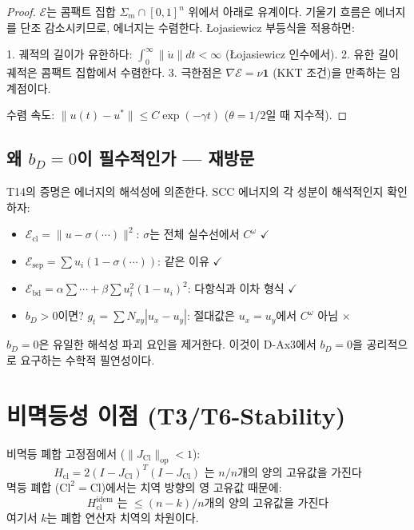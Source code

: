 \begin{proof}
$\mathcal{E}$는 콤팩트 집합 $\Sigma_m \cap [0,1]^n$ 위에서 아래로 유계이다. 기울기 흐름은 에너지를 단조 감소시키므로, 에너지는 수렴한다. \L{}ojasiewicz 부등식을 적용하면:

1. 궤적의 길이가 유한하다: $\int_0^\infty \|\dot{u}\| dt < \infty$ (\L{}ojasiewicz 인수에서).
2. 유한 길이 궤적은 콤팩트 집합에서 수렴한다.
3. 극한점은 $\nabla \mathcal{E} = \nu \mathbf{1}$ (KKT 조건)을 만족하는 임계점이다.

수렴 속도: $\|u(t) - u^*\| \leq C \exp(-\gamma t)$ ($\theta = 1/2$일 때 지수적).
\end{proof}

\subsection{왜 $b_D = 0$이 필수적인가 --- 재방문}

T14의 증명은 에너지의 해석성에 의존한다. SCC 에너지의 각 성분이 해석적인지 확인하자:
\begin{itemize}
    \item $\mathcal{E}_{\mathrm{cl}} = \|u - \sigma(\cdots)\|^2$: $\sigma$는 전체 실수선에서 $C^\omega$ $\checkmark$
    \item $\mathcal{E}_{\mathrm{sep}} = \sum u_i(1 - \sigma(\cdots))$: 같은 이유 $\checkmark$
    \item $\mathcal{E}_{\mathrm{bd}} = \alpha\sum\cdots + \beta\sum u_i^2(1-u_i)^2$: 다항식과 이차 형식 $\checkmark$
    \item $b_D > 0$이면? $g_t = \sum N_{xy}|u_x - u_y|$: 절대값은 $u_x = u_y$에서 $C^\omega$ 아님 $\times$
\end{itemize}

$b_D = 0$은 유일한 해석성 파괴 요인을 제거한다. 이것이 D-Ax3에서 $b_D = 0$을 공리적으로 요구하는 수학적 필연성이다.


\section{비멱등성 이점 (T3/T6-Stability)}
\label{sec:non-idempotence}

\begin{theorem}
\label{thm:stability}
비멱등 폐합 고정점에서 ($\|J_{\mathrm{Cl}}\|_{\mathrm{op}} < 1$):
\begin{equation}
    H_{\mathrm{cl}} = 2(I - J_{\mathrm{Cl}})^T(I - J_{\mathrm{Cl}}) \text{ 는 } n/n \text{개의 양의 고유값을 가진다}
\end{equation}
멱등 폐합 ($\mathrm{Cl}^2 = \mathrm{Cl}$)에서는 치역 방향의 영 고유값 때문에:
\begin{equation}
    H_{\mathrm{cl}}^{\mathrm{idem}} \text{ 는 } \leq (n-k)/n \text{개의 양의 고유값을 가진다}
\end{equation}
여기서 $k$는 폐합 연산자 치역의 차원이다.
\end{theorem}

